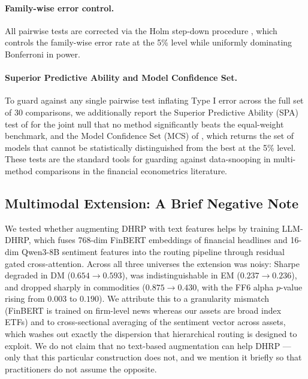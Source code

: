\documentclass{article}
\begin{document}
\paragraph{Family-wise error control.} All pairwise tests are corrected via the Holm step-down procedure \citep{Holm1979}, which controls the family-wise error rate at the 5\% level while uniformly dominating Bonferroni in power.

\paragraph{Superior Predictive Ability and Model Confidence Set.} To guard against any single pairwise test inflating Type I error across the full set of 30 comparisons, we additionally report the Superior Predictive Ability (SPA) test of \citet{Hansen2005} for the joint null that no method significantly beats the equal-weight benchmark, and the Model Confidence Set (MCS) of \citet{HansenLundeNason2011}, which returns the set of models that cannot be statistically distinguished from the best at the 5\% level. These tests are the standard tools for guarding against data-snooping in multi-method comparisons in the financial econometrics literature.

\subsection{Multimodal Extension: A Brief Negative Note}
\label{sec:llmablation}

We tested whether augmenting DHRP with text features helps by training LLM-DHRP, which fuses 768-dim FinBERT \citep{Huang2023} embeddings of financial headlines and 16-dim Qwen3-8B \citep{Qwen2025} sentiment features into the routing pipeline through residual gated cross-attention. Across all three universes the extension was noisy: Sharpe degraded in DM ($0.654 \to 0.593$), was indistinguishable in EM ($0.237 \to 0.236$), and dropped sharply in commodities ($0.875 \to 0.430$, with the FF6 alpha $p$-value rising from $0.003$ to $0.190$). We attribute this to a granularity mismatch (FinBERT is trained on firm-level news whereas our assets are broad index ETFs) and to cross-sectional averaging of the sentiment vector across assets, which washes out exactly the dispersion that hierarchical routing is designed to exploit. We do not claim that no text-based augmentation can help DHRP --- only that this particular construction does not, and we mention it briefly so that practitioners do not assume the opposite.
\end{document}
